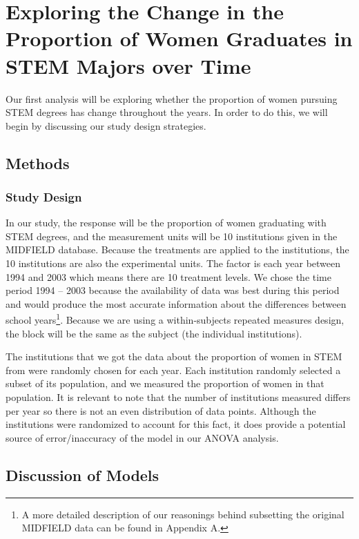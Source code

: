\documentclass[]{article}
\begin{document}
\section{Exploring the Change in the Proportion of Women Graduates in
STEM Majors over
Time}\label{exploring-the-change-in-the-proportion-of-women-graduates-in-stem-majors-over-time}

Our first analysis will be exploring whether the proportion of women
pursuing STEM degrees has change throughout the years. In order to do
this, we will begin by discussing our study design strategies.

\subsection{Methods}\label{methods}

\subsubsection{Study Design}\label{study-design}

In our study, the response will be the proportion of women graduating
with STEM degrees, and the measurement units will be 10 institutions
given in the MIDFIELD database. Because the treatments are applied to
the institutions, the 10 institutions are also the experimental units.
The factor is each year between 1994 and 2003 which means there are 10
treatment levels. We chose the time period 1994 -- 2003 because the
availability of data was best during this period and would produce the
most accurate information about the differences between school
years\footnote{A more detailed description of our reasonings behind subsetting the original MIDFIELD data can be found in Appendix A.}.
Because we are using a within-subjects repeated measures design, the
block will be the same as the subject (the individual institutions).

The institutions that we got the data about the proportion of women in
STEM from were randomly chosen for each year. Each institution randomly
selected a subset of its population, and we measured the proportion of
women in that population. It is relevant to note that the number of
institutions measured differs per year so there is not an even
distribution of data points. Although the institutions were randomized
to account for this fact, it does provide a potential source of
error/inaccuracy of the model in our ANOVA analysis.

\subsection{Discussion of Models}\label{discussion-of-models}
\end{document}
